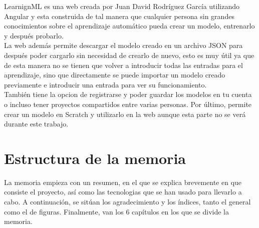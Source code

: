 \documentclass[a4paper, 12pt]{book}
\begin{document}
LearnignML es una web creada por Juan David Rodríguez García utilizando Angular y esta construida de tal manera que cualquier persona sin grandes conocimientos sobre el aprendizaje automático pueda crear un modelo, entrenarlo y después probarlo. \\
La web además permite descargar el modelo creado en un archivo JSON para después poder cargarlo sin necesidad de crearlo de nuevo, esto es muy útil ya que de esta manera no se tienen que volver a introducir todas las entradas para el aprendizaje, sino que directamente se puede importar un modelo creado previamente e introducir una entrada para ver su funcionamiento. \\
También tiene la opcion de registrarse y poder guardar los modelos en tu cuenta o incluso tener proyectos compartidos entre varias personas. Por último, permite crear un modelo en Scratch y utilizarlo en la web aunque esta parte no se verá durante este trabajo.


\section{Estructura de la memoria}
\label{sec:estructura}

La memoria empieza con un resumen, en el que se explica brevemente en que consiste el proyecto, así como las tecnologias que se han usado para llevarlo a cabo. A continuación, se sitúan los agradecimiento y los índices, tanto el general como el de figuras. Finalmente, van los 6 capítulos en los que se divide la memoria.
\end{document}
